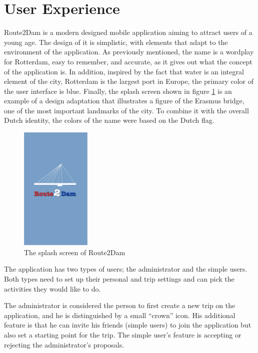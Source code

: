 \documentclass[11pt,a4paper,oneside]{article}
\begin{document}
\section{User Experience}
Route2Dam is a modern designed mobile application aiming to attract users of a young age. The design of it is simplistic, with elements that adapt to the environment of the application. As previously mentioned, the name is a wordplay for Rotterdam, easy to remember, and accurate, as it gives out what the concept of the application is. In addition, inspired by the fact that water is an integral element of the city, Rotterdam is the largest port in Europe, the primary color of the user interface is blue. Finally, the splash screen shown in figure \ref{fig:splash_screen} is an example of a design adaptation that illustrates a figure of the Erasmus bridge, one of the most important landmarks of the city. To combine it with the overall Dutch identity, the colors of the name were based on the Dutch flag. 


\begin{figure}[H]
    \centering
    \includegraphics[width=0.3\textwidth]{paper/imgs/hifi_prototypes/splash_screen.png}
    \caption{The splash screen of Route2Dam}
    \label{fig:splash_screen}
\end{figure}

The application has two types of users; the administrator and the simple users. Both types need to set up their personal and trip settings and can pick the activities they would like to do. 

The administrator is considered the person to first create a new trip on the application, and he is distinguished by a small “crown” icon. His additional feature is that he can invite his friends (simple users) to join the application but also set a starting point for the trip. The simple user's feature is accepting or rejecting the administrator’s proposals.
\end{document}
